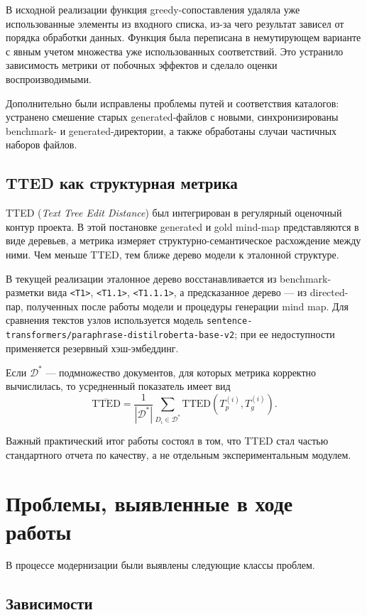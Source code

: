 \documentclass[12pt,a4paper]{article}
\begin{document}
В исходной реализации функция greedy-сопоставления удаляла уже использованные элементы из входного списка, из-за чего результат зависел от порядка обработки данных. Функция была переписана в немутирующем варианте с явным учетом множества уже использованных соответствий. Это устранило зависимость метрики от побочных эффектов и сделало оценки воспроизводимыми.

Дополнительно были исправлены проблемы путей и соответствия каталогов: устранено смешение старых generated-файлов с новыми, синхронизированы benchmark- и generated-директории, а также обработаны случаи частичных наборов файлов.

\subsection{TTED как структурная метрика}

TTED (\textit{Text Tree Edit Distance}) был интегрирован в регулярный оценочный контур проекта. В этой постановке generated и gold mind-map представляются в виде деревьев, а метрика измеряет структурно-семантическое расхождение между ними. Чем меньше TTED, тем ближе дерево модели к эталонной структуре.

В текущей реализации эталонное дерево восстанавливается из benchmark-разметки вида \texttt{<T1>}, \texttt{<T1.1>}, \texttt{<T1.1.1>}, а предсказанное дерево --- из directed-пар, полученных после работы модели и процедуры генерации mind map. Для сравнения текстов узлов используется модель \texttt{sentence-transformers/paraphrase-distilroberta-base-v2}; при ее недоступности применяется резервный хэш-эмбеддинг.

Если $\mathcal{D}^{*}$ --- подмножество документов, для которых метрика корректно вычислилась, то усредненный показатель имеет вид
\[
\overline{\mathrm{TTED}} =
\frac{1}{|\mathcal{D}^{*}|}
\sum_{D_i \in \mathcal{D}^{*}} \mathrm{TTED}(T_p^{(i)}, T_g^{(i)}).
\]

Важный практический итог работы состоял в том, что TTED стал частью стандартного отчета по качеству, а не отдельным экспериментальным модулем.

\section{Проблемы, выявленные в ходе работы}

В процессе модернизации были выявлены следующие классы проблем.

\subsection{Зависимости}
\end{document}
